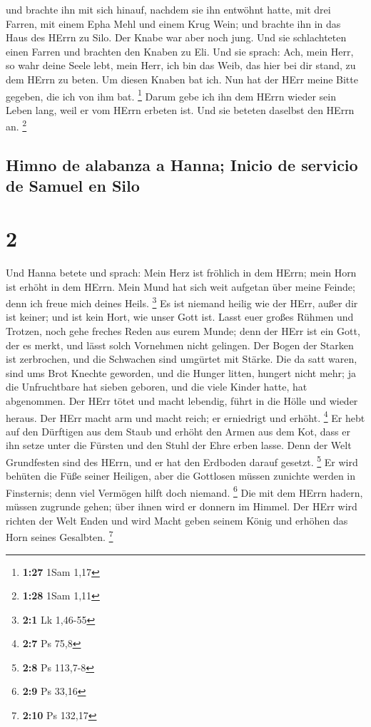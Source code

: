  und brachte ihn mit sich hinauf, nachdem sie ihn
entwöhnt hatte, mit drei Farren, mit einem Epha Mehl und einem Krug
Wein; und brachte ihn in das Haus des HErrn zu Silo. Der Knabe war aber
noch jung.  Und sie schlachteten einen Farren und
brachten den Knaben zu Eli.  Und sie sprach: Ach, mein
Herr, so wahr deine Seele lebt, mein Herr, ich bin das Weib, das hier
bei dir stand, zu dem HErrn zu beten.  Um diesen Knaben
bat ich. Nun hat der HErr meine Bitte gegeben, die ich von ihm bat.
\footnote{\textbf{1:27} 1Sam 1,17}  Darum gebe ich ihn
dem HErrn wieder sein Leben lang, weil er vom HErrn erbeten ist. Und sie
beteten daselbst den HErrn an. \footnote{\textbf{1:28} 1Sam 1,11}

\hypertarget{himno-de-alabanza-a-hanna-inicio-de-servicio-de-samuel-en-silo}{%
\subsection{Himno de alabanza a Hanna; Inicio de servicio de Samuel en
Silo}\label{himno-de-alabanza-a-hanna-inicio-de-servicio-de-samuel-en-silo}}

\hypertarget{section-1}{%
\section{2}\label{section-1}}

 Und Hanna betete und sprach: Mein Herz ist fröhlich in
dem HErrn; mein Horn ist erhöht in dem HErrn. Mein Mund hat sich weit
aufgetan über meine Feinde; denn ich freue mich deines Heils.
\footnote{\textbf{2:1} Lk 1,46-55}  Es ist niemand heilig
wie der HErr, außer dir ist keiner; und ist kein Hort, wie unser Gott
ist.  Lasst euer großes Rühmen und Trotzen, noch gehe
freches Reden aus eurem Munde; denn der HErr ist ein Gott, der es merkt,
und lässt solch Vornehmen nicht gelingen.  Der Bogen der
Starken ist zerbrochen, und die Schwachen sind umgürtet mit Stärke.
 Die da satt waren, sind ums Brot Knechte geworden, und
die Hunger litten, hungert nicht mehr; ja die Unfruchtbare hat sieben
geboren, und die viele Kinder hatte, hat abgenommen.  Der
HErr tötet und macht lebendig, führt in die Hölle und wieder heraus.
 Der HErr macht arm und macht reich; er erniedrigt und
erhöht. \footnote{\textbf{2:7} Ps 75,8}  Er hebt auf den
Dürftigen aus dem Staub und erhöht den Armen aus dem Kot, dass er ihn
setze unter die Fürsten und den Stuhl der Ehre erben lasse. Denn der
Welt Grundfesten sind des HErrn, und er hat den Erdboden darauf gesetzt.
\footnote{\textbf{2:8} Ps 113,7-8}  Er wird behüten die
Füße seiner Heiligen, aber die Gottlosen müssen zunichte werden in
Finsternis; denn viel Vermögen hilft doch niemand. \footnote{\textbf{2:9}
  Ps 33,16}  Die mit dem HErrn hadern, müssen zugrunde
gehen; über ihnen wird er donnern im Himmel. Der HErr wird richten der
Welt Enden und wird Macht geben seinem König und erhöhen das Horn seines
Gesalbten. \footnote{\textbf{2:10} Ps 132,17}

